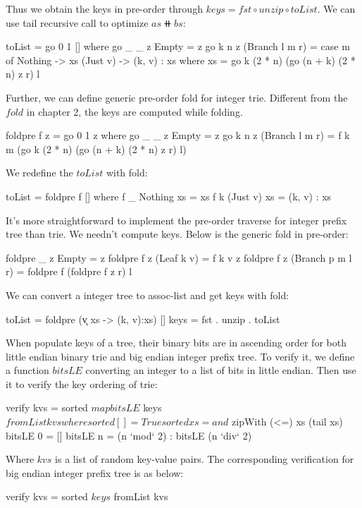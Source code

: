 \documentclass[b5paper]{article}
\begin{document}
\begin{Answer}[ref = {ex:int-tree-lookup}]
{Thus we obtain the keys in pre-order through $keys = fst \circ unzip \circ toList$. We can use tail recursive call to optimize $as \doubleplus bs$:

\begin{Haskell}
toList = go 0 1 [] where
  go _ _ z Empty = z
  go k n z (Branch l m r) = case m of
    Nothing -> xs
    (Just v) -> (k, v) : xs
    where xs = go k (2 * n) (go (n + k) (2 * n) z r) l
\end{Haskell}

Further, we can define generic pre-order fold for integer trie. Different from the $fold$ in chapter 2, the keys are computed while folding.

\begin{Haskell}
foldpre f z = go 0 1 z where
  go _ _ z Empty = z
  go k n z (Branch l m r) = f k m (go k (2 * n) (go (n + k) (2 * n) z r) l)
\end{Haskell}

We redefine the $toList$ with fold:

\begin{Haskell}
toList = foldpre f [] where
  f _ Nothing xs = xs
  f k (Just v) xs = (k, v) : xs
\end{Haskell}

It's more straightforward to implement the pre-order traverse for integer prefix tree than trie. We needn't compute keys. Below is the generic fold in pre-order:

\begin{Haskell}
foldpre _ z Empty = z
foldpre f z (Leaf k v) = f k v z
foldpre f z (Branch p m l r) = foldpre f (foldpre f z r) l
\end{Haskell}

We can convert a integer tree to assoc-list and get keys with fold:
\begin{Haskell}
toList = foldpre (\k v xs -> (k, v):xs) []
keys = fst . unzip . toList
\end{Haskell}

When populate keys of a tree, their binary bits are in ascending order for both little endian binary trie and big endian integer prefix tree. To verify it, we define a function $bitsLE$ converting an integer to a list of bits in little endian. Then use it to verify the key ordering of trie:

\begin{Haskell}
verify kvs = sorted $ map bitsLE $ keys $ fromList kvs where
  sorted [] = True
  sorted xs = and $ zipWith (<=) xs (tail xs)
  bitsLE 0 = []
  bitsLE n = (n `mod` 2) : bitsLE (n `div` 2)
\end{Haskell}

Where $kvs$ is a list of random key-value pairs. The corresponding verification for big endian integer prefix tree is as below:

\begin{Haskell}
verify kvs = sorted $ keys $ fromList kvs
\end{Haskell}
}
\end{Answer}
\end{document}

